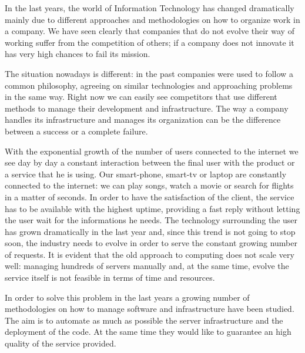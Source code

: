 

In the last years, the world of Information Technology has changed
dramatically mainly due to different approaches and methodologies on how
to organize work in a company. We have seen clearly that companies that do
not evolve their way of working suffer from the competition of others; if
a company does not innovate it has very high chances to fail its mission.

The situation nowadays is different: in the past companies were used to
follow a common philosophy, agreeing on similar technologies and
approaching problems in the same way. Right now we can easily see
competitors that use different methods to manage their development and
infrastructure. The way a company handles its infrastructure and manages
its organization can be the difference between a success or a complete
failure.

With the exponential growth of the number of users connected to the
internet we see day by day a constant interaction between the final user
with the product or a service that he is using. Our smart-phone, smart-tv
or laptop are constantly connected to the internet: we can play songs,
watch a movie or search for flights in a matter of seconds. In order to
have the satisfaction of the client, the service has to be available with
the highest uptime, providing a fast reply without letting the user wait
for the informations he needs. The technology surrounding the user has
grown dramatically in the last year and, since this trend is not going to
stop soon, the industry needs to evolve in order to serve the constant
growing number of requests. It is evident that the old approach to
computing does not scale very well: managing hundreds of servers manually
and, at the same time, evolve the service itself is not feasible in terms
of time and resources.

In order to solve this problem in the last years a growing number of
methodologies on how to manage software and infrastructure have been
studied. The aim is to automate as much as possible the server
infrastructure and the deployment of the code. At the same time they would
like to guarantee an high quality of the service provided.

